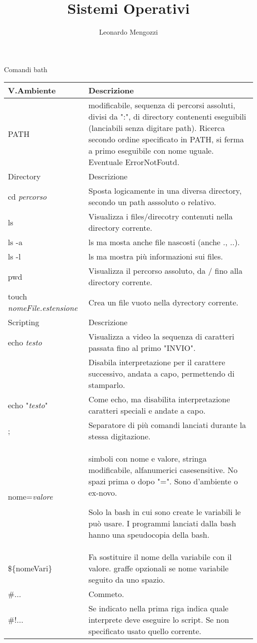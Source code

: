 \documentclass{article}
\title{Sistemi Operativi}
\author{Leonardo Mengozzi}
\date{}
\newcommand{\sezione}[1]{\hline#1 & Descrizione\\\hline}
\begin{document}
	\maketitle

	\centering
	{\large Comandi bath}\\[0.01\textheight]

	\begin{tabularx}{\textwidth}{lX}
	\sezione{V.Ambiente}
	PATH & modificabile, sequenza di percorsi assoluti, divisi da ":", di directory contenenti eseguibili (lanciabili senza digitare path). Ricerca secondo ordine specificato in PATH, si ferma a primo eseguibile con nome uguale. Eventuale ErrorNotFoutd.\\

	\sezione{Directory}
	cd \textit{percorso} & Sposta logicamente in una diversa directory, secondo un path asssoluto o relativo.\\
	ls & Visualizza i files/direcotry contenuti nella directory corrente.\\
	ls -a & ls ma mosta anche file nascosti (anche ., ..).\\
	ls -l & ls ma mostra più informazioni sui files.\\
	pwd & Visualizza il percorso assoluto, da / fino alla directory corrente.\\
	touch \textit{nomeFile.estensione} & Crea un file vuoto nella dyrectory corrente.\\

	\sezione{Scripting}
	echo \textit{testo} & Visualizza a video la sequenza di caratteri passata fino al primo "INVIO".\\
	\ & Disabila interpretazione per il carattere successivo, andata a capo, permettendo di stamparlo.\\
	echo "\textit{testo}" & Come echo, ma disabilita interpretazione caratteri speciali e andate a capo.\\
	; & Separatore di più comandi lanciati durante la stessa digitazione.\\
	nome=\textit{valore} & simboli con nome e valore, stringa modificabile, alfanumerici casesensitive. No spazi prima o dopo "=". Sono d'ambiente o ex-novo.

	Solo la bash in cui sono create le variabili le può usare. I programmi lanciati dalla bash hanno una speudocopia della bash.\\
	\$\{nomeVari\} & Fa sostituire il nome della variabile con il valore. graffe opzionali se nome variabile seguito da uno spazio.\\
	\#... & Commeto.\\
	\#!... & Se indicato nella prima riga indica quale interprete deve eseguire lo script. Se non specificato usato quello corrente.\\


\end{tabularx}
\end{document}
